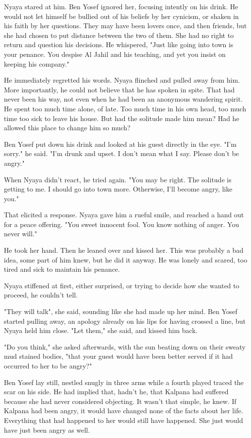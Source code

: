 \documentclass{amsart}
\begin{document}
Nyaya stared at him. Ben Yosef ignored her, focusing intently on his drink. He would not let himself be bullied out of his beliefs by her cynicism, or shaken in his faith by her questions. They may have been lovers once, and then friends, but she had chosen to put distance between the two of them. She had no right to return and question his decisions. He whispered, "Just like going into town is your penance. You despise Al Jahil and his teaching, and yet you insist on keeping his company." 

He immediately regretted his words. Nyaya flinched and pulled away from him. More importantly, he could not believe that he has spoken in spite. That had never been his way, not even when he had been an anonymous wandering spirit. He spent too much time alone, of late. Too much time in his own head, too much time too sick to leave his house. But had the solitude made him mean? Had he allowed this place to change him so much?

Ben Yosef put down his drink and looked at his guest directly in the eye. "I'm sorry." he said. "I'm drunk and upset. I don't mean what I say. Please don't be angry."

When Nyaya didn't react, he tried again. "You may be right. The solitude is getting to me. I should go into town more. Otherwise, I'll become angry, like you." 

That elicited a response. Nyaya gave him a rueful smile, and reached a hand out for a peace offering. "You sweet innocent fool. You know nothing of anger. You never will." 

He took her hand. Then he leaned over and kissed her. This was probably a bad idea, some part of him knew, but he did it anyway. He was lonely and scared, too tired and sick to maintain his penance. 

Nyaya stiffened at first, either surprised, or trying to decide how she wanted to proceed, he couldn't tell. 

"They will talk", she said, sounding like she had made up her mind. Ben Yosef started pulling away, an apology already on his lips for having crossed a line, but Nyaya held him close. "Let them," she said, and kissed him back.

"Do you think," she asked afterwards, with the sun beating down on their sweaty mud stained bodies, "that your guest would have been better served if it had occurred to her to be angry?" 

Ben Yosef lay still, nestled snugly in three arms while a fourth played traced the scar on his side. He had implied that, hadn't he, that Kalpana had suffered because she had never considered objecting. It wasn't that simple, he knew. If Kalpana had been angry, it would have changed none of the facts about her life. Everything that had happened to her would still have happened. She just would have just been angry as well.
\end{document}
